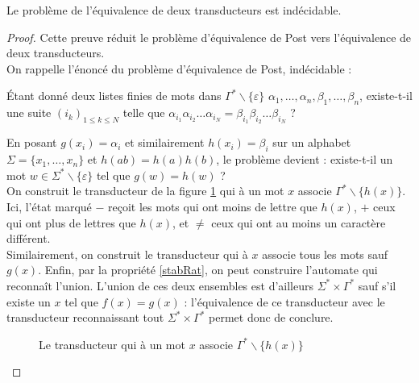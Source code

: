 \documentclass{scrartcl}
\begin{document}
\begin{flushleft}
\begin{theorem}
    Le problème de l'équivalence de deux transducteurs est indécidable.
\end{theorem}

\begin{proof}
    Cette preuve réduit le problème d'équivalence de Post vers l'équivalence de deux transducteurs.\\
    On rappelle l'énoncé du problème d'équivalence de Post, indécidable :
    \begin{define}
    Étant donné deux listes finies de mots dans $\Gamma^*\backslash \{\varepsilon\}$ $\alpha_1, \dots, \alpha_n , \beta_1, \dots, \beta_n$, existe-t-il une suite $(i_k)_{1\leq k \leq N}$ telle que $\alpha_{i_1} \alpha_{i_2} \dots \alpha_{i_N} = \beta_{i_1} \beta_{i_2} \dots \beta_{i_N}$ ?
    \end{define}
    En posant $g(x_i)=\alpha_i$ et similairement $h(x_i)=\beta_i$ sur un alphabet $\Sigma=\{x_1, \dots, x_n\}$ et $h(ab) = h(a)h(b)$,
    le problème devient : existe-t-il un mot $w\in \Sigma^*\backslash \{\varepsilon \}$ tel que $g(w) = h(w)$ ?\\
    On construit le transducteur de la figure \ref{autoG-h} qui à un mot $x$ associe $\Gamma^* \backslash \{h(x)\}$.\\
    Ici, l'état marqué $-$ reçoit les mots qui ont moins de lettre que $h(x)$, $+$ ceux qui ont plus de lettres que $h(x)$, et $\neq$
    ceux qui ont au moins un caractère différent.\\
    Similairement, on construit le transducteur qui à $x$ associe tous les mots sauf $g(x)$. Enfin, par la propriété \ref{stabRat}, on
    peut construire l'automate qui reconnaît l'union. L'union de ces deux ensembles est d'ailleurs $\Sigma^* \times \Gamma^*$ sauf 
    s'il existe un $x$ tel que $f(x) = g(x)$ : l'équivalence de ce transducteur avec le transducteur reconnaissant tout $\Sigma^* \times
    \Gamma^*$ permet donc de conclure.

\begin{figure}[h] 
    \caption{Le transducteur qui à un mot $x$ associe $\Gamma^* \backslash \{h(x)\}$} \label{autoG-h}
    \begin{center}
\end{center}
\end{figure}
\end{proof}
\end{flushleft}
\end{document}
